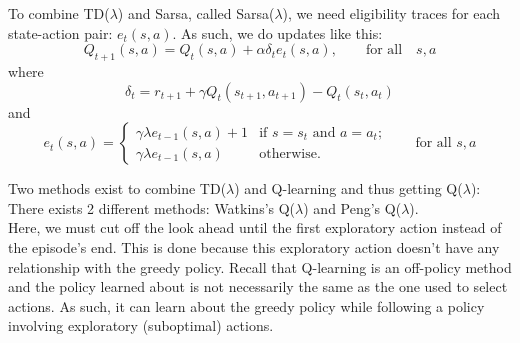\documentclass[a4paper]{article}
\begin{document}
To combine TD($\lambda$) and Sarsa, called Sarsa($\lambda$), we need eligibility traces for each state-action pair: $e_t(s,a)$. As such, we do updates like this:
\begin{equation}
Q_{t+1}(s,a) = Q_t(s,a) + \alpha \delta_t e_t(s,a), \qquad \text{for all} \quad s,a
\end{equation}
where
\begin{equation}
\delta_t = r_{t+1} + \gamma Q_t(s_{t+1},a_{t+1}) - Q_t(s_t,a_t)
\end{equation}
and
\begin{equation}
e_t(s,a) = \begin{cases}
	\gamma \lambda e_{t-1}(s,a) + 1 & \text{if $s=s_t$ and $a=a_t$;} \\
	\gamma \lambda e_{t-1}(s,a) & \text{otherwise}.
\end{cases}
\qquad \text{for all $s,a$}
\end{equation}

Two methods exist to combine TD($\lambda$) and Q-learning and thus getting Q($\lambda$): There exists 2 different methods: Watkins's Q($\lambda$) and Peng's Q($\lambda$).\\
Here, we must cut off the look ahead until the first exploratory action instead of the episode's end. This is done because this exploratory action doesn't have any relationship with the greedy policy. Recall that Q-learning is an off-policy method and the policy learned about is not necessarily the same as the one used to select actions. As such, it can learn about the greedy policy while following a policy involving exploratory (suboptimal) actions.
\end{document}
